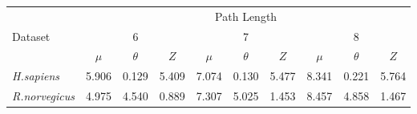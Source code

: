 \begin{table}[t]
   {
\begin{tabular}{|l|c|c|c|c|c|c|c|c|c|}
\hline
	&	\multicolumn{9}{c|}{Path Length}		\\ \cline{2-10}
Dataset	&	\multicolumn{3}{c|}{6}	&	\multicolumn{3}{c|}{7}	&
	\multicolumn{3}{c|}{8}	\\
	\cline{2-10} 
		&	\begin{math}\mu\end{math}	&	\begin{math}\theta\end{math}	&
	\begin{math}Z\end{math} & \begin{math}\mu\end{math}	&	\begin{math}\theta\end{math}	&
	\begin{math}Z\end{math} & \begin{math}\mu\end{math}	&
	\begin{math}\theta\end{math}	& \begin{math}Z\end{math}	\\ \hline
{\it H.sapiens}	&	5.906	&	0.129	&	5.409	&	7.074	&	0.130	&	5.477	&	8.341	&
0.221	&	5.764	\\
{\it R.norvegicus}	&	4.975	&	4.540	&	0.889	&	7.307	&	5.025	&	1.453	&
8.457	&	4.858	&	1.467
\\
\hline
\end{tabular}
}
\label{tab:zscore}
\end{table}

